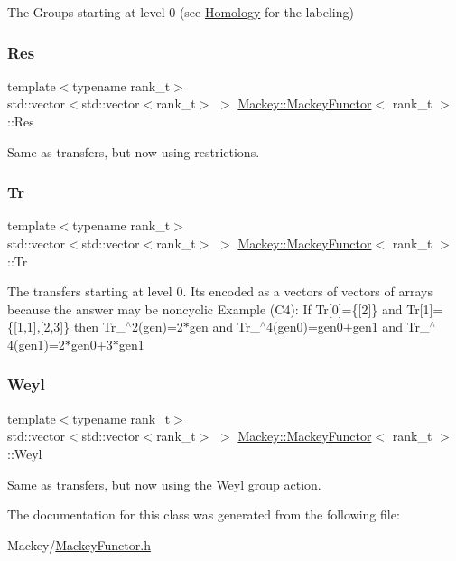 The Groups starting at level 0 (see \hyperlink{classMackey_1_1Homology}{Homology} for the labeling) 

\mbox{\label{classMackey_1_1MackeyFunctor_a9299f915835edaa2b67880bfe6330502}} 
\subsubsection{\texorpdfstring{Res}{Res}}
{\footnotesize\ttfamily template$<$typename rank\+\_\+t$>$ \\
std\+::vector$<$std\+::vector$<$rank\+\_\+t$>$ $>$ \hyperlink{classMackey_1_1MackeyFunctor}{Mackey\+::\+Mackey\+Functor}$<$ rank\+\_\+t $>$\+::Res}



Same as transfers, but now using restrictions. 

\mbox{\label{classMackey_1_1MackeyFunctor_a3106846b46d3eb4d297abe785bdb0481}} 
\subsubsection{\texorpdfstring{Tr}{Tr}}
{\footnotesize\ttfamily template$<$typename rank\+\_\+t$>$ \\
std\+::vector$<$std\+::vector$<$rank\+\_\+t$>$ $>$ \hyperlink{classMackey_1_1MackeyFunctor}{Mackey\+::\+Mackey\+Functor}$<$ rank\+\_\+t $>$\+::Tr}

The transfers starting at level 0. It\textquotesingle{}s encoded as a vectors of vectors of arrays because the answer may be noncyclic Example (C4)\+: If Tr\mbox{[}0\mbox{]}=\{\mbox{[}2\mbox{]}\} and Tr\mbox{[}1\mbox{]}=\{\mbox{[}1,1\mbox{]},\mbox{[}2,3\mbox{]}\} then Tr\+\_$^\wedge$2(gen)=2$\ast$gen and Tr\+\_$^\wedge$4(gen0)=gen0+gen1 and Tr\+\_$^\wedge$4(gen1)=2$\ast$gen0+3$\ast$gen1 \mbox{\label{classMackey_1_1MackeyFunctor_aa6488386f0731b1a2c80b494376709a0}} 
\subsubsection{\texorpdfstring{Weyl}{Weyl}}
{\footnotesize\ttfamily template$<$typename rank\+\_\+t$>$ \\
std\+::vector$<$std\+::vector$<$rank\+\_\+t$>$ $>$ \hyperlink{classMackey_1_1MackeyFunctor}{Mackey\+::\+Mackey\+Functor}$<$ rank\+\_\+t $>$\+::Weyl}



Same as transfers, but now using the Weyl group action. 



The documentation for this class was generated from the following file\+:\begin{DoxyCompactItemize}
\item 
Mackey/\hyperlink{MackeyFunctor_8h}{Mackey\+Functor.\+h}\end{DoxyCompactItemize}
